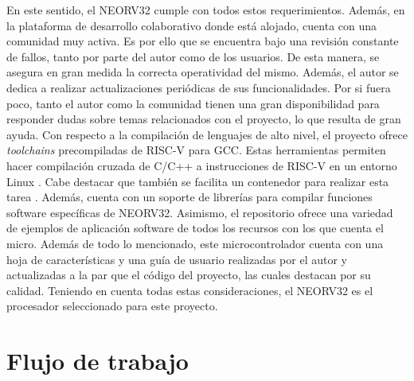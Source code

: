 En este sentido, el NEORV32 \cite{gh:neorv32} cumple con todos estos requerimientos. 
Además, en la plataforma de desarrollo colaborativo donde está alojado, cuenta con una comunidad muy activa.
Es por ello que se encuentra bajo una revisión constante de fallos, tanto por parte del autor como de los usuarios.
De esta manera, se asegura en gran medida la correcta operatividad del mismo.
Además, el autor se dedica a realizar actualizaciones periódicas de sus funcionalidades.
Por si fuera poco, tanto el autor como la comunidad tienen una gran disponibilidad para responder dudas sobre temas relacionados con el proyecto, lo que resulta de gran ayuda.
Con respecto a la compilación de lenguajes de alto nivel, el proyecto ofrece \textit{toolchains} precompiladas de RISC-V para GCC.  
Estas herramientas permiten hacer compilación cruzada de C/C++ a instrucciones de RISC-V  en un entorno Linux \cite{gh:neorv32-tool}.
Cabe destacar que también se facilita un contenedor para realizar esta tarea \cite{gh:sim-conatiner}. 
Además, cuenta con un soporte de librerías para compilar funciones software específicas de NEORV32. 
Asimismo, el repositorio ofrece una variedad de ejemplos de aplicación software de todos los recursos con los que cuenta el micro.
Además de todo lo mencionado, este microcontrolador cuenta con una hoja de características \cite{neorv32-ds} y una guía de usuario \cite{neorv32-ug} realizadas por el autor y actualizadas a la par que el código del proyecto, las cuales destacan por su calidad.
Teniendo en cuenta todas estas consideraciones, el NEORV32 es el procesador seleccionado para este proyecto.

\section{Flujo de trabajo}

\label{Workf}

